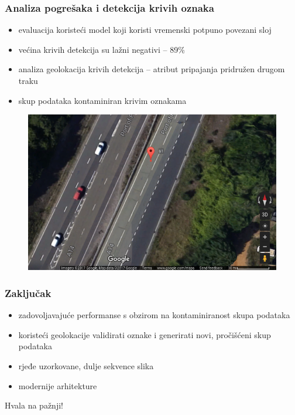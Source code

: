 \documentclass{beamer}
\begin{document}
\begin{frame}
 \frametitle{Analiza pogrešaka i detekcija krivih oznaka}
 \begin{itemize}
  \item evaluacija koristeći model koji koristi vremenski potpuno povezani sloj
  \item većina krivih detekcija su lažni negativi -- 89\%
  \item analiza geolokacija krivih detekcija -- atribut pripajanja pridružen drugom traku
  \item skup podataka kontaminiran krivim oznakama
 \end{itemize}
 
  \begin{figure}[H]
\centering
\includegraphics[scale=0.25]{images/wrong_lane_label.png}
\end{figure} 

\end{frame}

\begin{frame}
\frametitle{Zaključak}
 \begin{itemize}
  \item zadovoljavajuće performanse s obzirom na kontaminiranost skupa podataka
  \item koristeći geolokacije validirati oznake i generirati novi, pročišćeni skup podataka
  \item rjeđe uzorkovane, dulje sekvence slika
  \item modernije arhitekture
 \end{itemize}

\end{frame}

\begin{frame}
\Huge{\centerline{Hvala na pažnji!}}
\end{frame}
\end{document}
